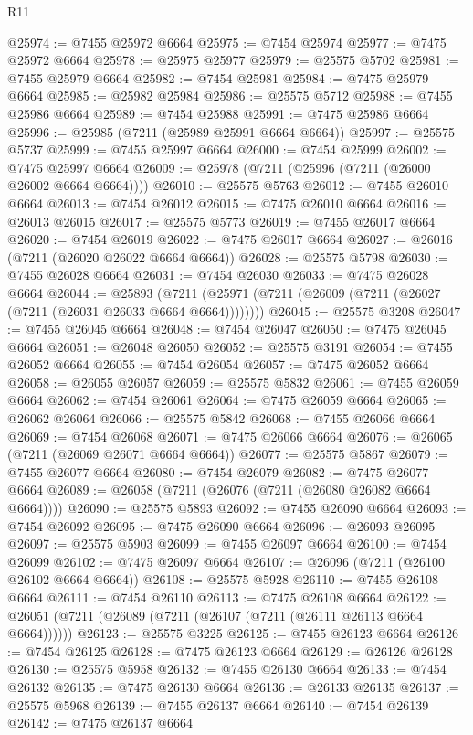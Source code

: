 \begin{lexlean}{R11}
\begin{coremodule}
@25974 := @7455 @25972 @6664
@25975 := @7454 @25974
@25977 := @7475 @25972 @6664
@25978 := @25975 @25977
@25979 := @25575 @5702
@25981 := @7455 @25979 @6664
@25982 := @7454 @25981
@25984 := @7475 @25979 @6664
@25985 := @25982 @25984
@25986 := @25575 @5712
@25988 := @7455 @25986 @6664
@25989 := @7454 @25988
@25991 := @7475 @25986 @6664
@25996 := @25985 (@7211 (@25989 @25991 @6664 @6664))
@25997 := @25575 @5737
@25999 := @7455 @25997 @6664
@26000 := @7454 @25999
@26002 := @7475 @25997 @6664
@26009 := @25978 (@7211 (@25996 (@7211 (@26000 @26002 @6664 @6664))))
@26010 := @25575 @5763
@26012 := @7455 @26010 @6664
@26013 := @7454 @26012
@26015 := @7475 @26010 @6664
@26016 := @26013 @26015
@26017 := @25575 @5773
@26019 := @7455 @26017 @6664
@26020 := @7454 @26019
@26022 := @7475 @26017 @6664
@26027 := @26016 (@7211 (@26020 @26022 @6664 @6664))
@26028 := @25575 @5798
@26030 := @7455 @26028 @6664
@26031 := @7454 @26030
@26033 := @7475 @26028 @6664
@26044 := @25893
    (@7211 (@25971 (@7211 (@26009 (@7211 (@26027 (@7211 (@26031 @26033 @6664 @6664))))))))
@26045 := @25575 @3208
@26047 := @7455 @26045 @6664
@26048 := @7454 @26047
@26050 := @7475 @26045 @6664
@26051 := @26048 @26050
@26052 := @25575 @3191
@26054 := @7455 @26052 @6664
@26055 := @7454 @26054
@26057 := @7475 @26052 @6664
@26058 := @26055 @26057
@26059 := @25575 @5832
@26061 := @7455 @26059 @6664
@26062 := @7454 @26061
@26064 := @7475 @26059 @6664
@26065 := @26062 @26064
@26066 := @25575 @5842
@26068 := @7455 @26066 @6664
@26069 := @7454 @26068
@26071 := @7475 @26066 @6664
@26076 := @26065 (@7211 (@26069 @26071 @6664 @6664))
@26077 := @25575 @5867
@26079 := @7455 @26077 @6664
@26080 := @7454 @26079
@26082 := @7475 @26077 @6664
@26089 := @26058 (@7211 (@26076 (@7211 (@26080 @26082 @6664 @6664))))
@26090 := @25575 @5893
@26092 := @7455 @26090 @6664
@26093 := @7454 @26092
@26095 := @7475 @26090 @6664
@26096 := @26093 @26095
@26097 := @25575 @5903
@26099 := @7455 @26097 @6664
@26100 := @7454 @26099
@26102 := @7475 @26097 @6664
@26107 := @26096 (@7211 (@26100 @26102 @6664 @6664))
@26108 := @25575 @5928
@26110 := @7455 @26108 @6664
@26111 := @7454 @26110
@26113 := @7475 @26108 @6664
@26122 := @26051 (@7211 (@26089 (@7211 (@26107 (@7211 (@26111 @26113 @6664 @6664))))))
@26123 := @25575 @3225
@26125 := @7455 @26123 @6664
@26126 := @7454 @26125
@26128 := @7475 @26123 @6664
@26129 := @26126 @26128
@26130 := @25575 @5958
@26132 := @7455 @26130 @6664
@26133 := @7454 @26132
@26135 := @7475 @26130 @6664
@26136 := @26133 @26135
@26137 := @25575 @5968
@26139 := @7455 @26137 @6664
@26140 := @7454 @26139
@26142 := @7475 @26137 @6664

\end{coremodule}
\end{lexlean}
